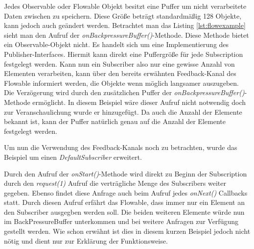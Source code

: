 Jedes Observable oder Flowable Objekt besitzt eine Puffer um nicht verarbeitete Daten zwischen zu speichern. Diese Größe beträgt standardmäßig 128 Objekte, kann jedoch auch geändert werden. Betrachtet man das Listing \ref{lst:flowexample} sieht man den Aufruf der \textit{onBackpressureBuffer()}-Methode. Diese Methode bietet ein Observable-Objekt nicht. Es handelt sich um eine Implementierung des Publisher-Interfaces. Hiermit kann direkt eine Puffergröße für jede Subscription festgelegt werden. Kann nun ein Subscriber also nur eine gewisse Anzahl von Elementen verarbeiten, kann über den bereits erwähnten Feedback-Kanal des Flowable informiert werden, die Objekte wenn möglich langsamer auszugeben. Die Verzögerung wird durch den zusätzlichen Puffer der \textit{onBackpressureBuffer()}-Methode ermöglicht. In diesem Beispiel wäre dieser Aufruf nicht notwendig doch zur Veranschaulichung wurde er hinzugefügt. Da auch die Anzahl der Elemente bekannt ist, kann der Puffer natürlich genau auf die Anzahl der Elemente festgelegt werden.

Um nun die Verwendung des Feedback-Kanals noch zu betrachten, wurde das Beispiel um einen \textit{DefaultSubscriber} erweitert.

Durch den Aufruf der \textit{onStart()}-Methode wird direkt zu Beginn der Subscription durch den \textit{request(1)} Aufruf die verträgliche Menge des Subscribers weiter gegeben. Ebenso findet diese Anfrage auch beim Aufruf jedes \textit{onNext()} Callbacks statt. Durch diesen Aufruf erfährt das Flowable, dass immer nur ein Element an den Subscriber ausgegben werden soll. Die beiden weiteren Elemente würde nun im BackPressureBuffer unterkommen und bei weitere Anfragen zur Verfügung gestellt werden. Wie schon erwähnt ist dies in diesem kurzen Beispiel jedoch nicht nötig und dient nur zur Erklärung der Funktionsweise.
